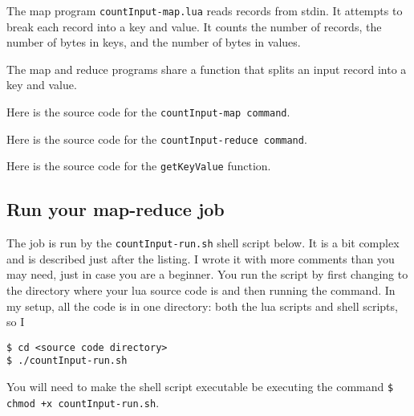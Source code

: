 \documentclass{article}
\let\code\texttt %
\begin{document}
The map program \code{countInput-map.lua} reads records from stdin. It
attempts to break each record into a key and value. It counts the number
of records, the number of bytes in keys, and the number of bytes in
values.

The map and reduce programs share a function that splits an input record
into a key and value.

Here is the source code for the \code{countInput-map command}.




Here is the source code for the \code{countInput-reduce command}.




Here is the source code for the \code{getKeyValue} function.



\subsection{Run your map-reduce job}

The job is run by the \code{countInput-run.sh} shell script below. It is
a bit complex and is described just after the listing. I wrote it with
more comments than you may need, just in case you are a beginner. You
run the script by first changing to the directory where your lua source
code is and then running the command. In my setup, all the code is in
one directory: both the lua scripts and shell scripts, so I 

\begin{verbatim}
$ cd <source code directory>
$ ./countInput-run.sh
\end{verbatim}

You will need to make the shell script executable be executing the
command \code{\$ chmod +x countInput-run.sh}.


\end{document}
